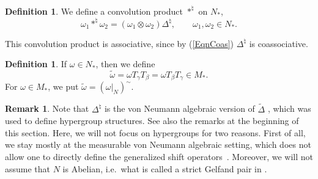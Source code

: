 \documentclass[pdftex]{sigma}
\numberwithin{equation}{section}
\theoremstyle{definition}
\newtheorem{dfn}[thm]{Definition}
\newtheorem{rmk}[thm]{Remark}
\begin{document}
\begin{dfn}
 We def\/ine a convolution product $\ast^\natural$ on $N_\ast$,
\[
\omega_1 \ast^\natural \omega_2 = (\omega_1 \otimes \omega_2) \Delta^\natural, \qquad  \omega_1, \omega_2 \in N_\ast.
\]
\end{dfn}

This convolution product is associative, since by (\ref{EqnCoas}) $\Delta^\natural$ is coassociative.

\begin{dfn}
If $\omega \in N_\ast$, then we def\/ine
\[
\tilde{\omega} = \omega T_\gamma  T_\beta = \omega T_\beta T_\gamma \in M_\ast.
\]
 For $\omega \in M_\ast$, we put $\tilde{\omega} = (\omega \vert_N)^\sim$.
\end{dfn}


\begin{rmk}
Note that $\Delta^\natural$ is the von Neumann algebraic version of $\tilde{\Delta}$ \cite{VaiHyp}, which was used to def\/ine hypergroup structures. See also the remarks at the beginning of this section. Here, we will not focus on hypergroups for two reasons. First of all, we stay mostly at the measurable von Neumann algebraic setting, which does not allow one to directly def\/ine the generalized shift operators~\cite{VaiHyp}. Moreover, we will not assume that $N$ is Abelian, i.e.\ what is called a strict Gelfand pair in \cite{VaiHyp}.
\end{rmk}
\end{document}
